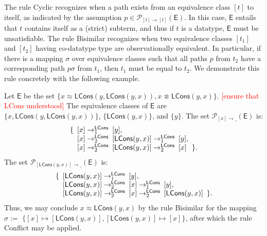 \documentclass[a4paper,oribibl,envcountsame,draft]{llncs}
\newcommand\const[1]{\textsf{#1}}
\newcommand{\Ec}{\mathsf{E}}
\newcommand{\rn}[1]{\textsf{\small #1}}
\newcommand{\teq}{\approx}
\newcommand{\tneq}{\not\teq}
\newcommand{\rem}[1]{\textcolor{red}{[#1]}}
\newcommand{\tpath}[2]{\mathcal{P}_{ #2 \rightarrow \_ }( #1 )}
\newcommand{\ttpath}[3]{\mathcal{P}_{ #2 \rightarrow #3 }( #1 )}
\newcommand{\ec}[1]{ [ #1 ] }
\begin{document}
The rule \rn{Cyclic} recognizes when a path exists from an equivalence class $\ec{t}$ to itself, as indicated
by the assumption $p \in \ttpath{\Ec}{\ec{t}}{\ec{t}}$.
In this case, $\Ec$ entails that $t$ contains itself as a (strict) subterm,
and thus if $t$ is a datatype, $\Ec$ must be unsatisfiable.
The rule \rn{Bisimilar} recognizes when two equivalence classes $\ec{t_1}$ and $\ec{t_2}$ having co-datatype type are observationally equivalent.
In particular, if there is a mapping $\sigma$ over equivalence classes such that all paths $p$ from $t_2$
have a corresponding path $p \sigma$ from $t_1$,
then $t_1$ must be equal to $t_2$.
We demonstrate this rule concretely with the following example.

\begin{example}
Let $\Ec$ be the set $\{ x \teq \const{LCons}(y,\const{LCons}(y,x)), x \tneq \const{LCons}(y,x) \}$.  \rem{ensure that \const{LCons} understood}
The equivalence classes of $\Ec$ are $\{ x, \const{LCons}(y,\const{LCons}(y,x)) \}$, $\{ \const{LCons}(y,x) \}$, and $\{ y \}$.
The set $\tpath{\Ec}{\ec{x}}$ is:
\[\begin{array}{l@{\hspace{.5em}}l@{\hspace{.5em}}l@{\hspace{.5em}}l@{\hspace{.5em}}l}
\{ & \ec{x} \rightarrow^{\const{LCons}}_1 & \ec{y}, & & \\ 
   & \ec{x} \rightarrow^{\const{LCons}}_2 & \ec{\const{LCons}(y,x)} \rightarrow^{\const{LCons}}_1 & \ec{y},& \\
   & \ec{x} \rightarrow^{\const{LCons}}_2 & \ec{\const{LCons}(y,x)} \rightarrow^{\const{LCons}}_2 & \ec{x} & \}.
\end{array}\]
The set $\tpath{\Ec}{\ec{\const{LCons}(y,x)}}$ is:
\[\begin{array}{l@{\hspace{.5em}}l@{\hspace{.5em}}l@{\hspace{.5em}}l@{\hspace{.5em}}l}
\{ & \ec{\const{LCons}(y,x)} \rightarrow^{\const{LCons}}_1 & \ec{y}, & & \\ 
   & \ec{\const{LCons}(y,x)} \rightarrow^{\const{LCons}}_2 & \ec{x} \rightarrow^{\const{LCons}}_1 & \ec{y},& \\
   & \ec{\const{LCons}(y,x)} \rightarrow^{\const{LCons}}_2 & \ec{x} \rightarrow^{\const{LCons}}_2 & \ec{\const{LCons}(y,x)} & \}.
\end{array}\]
Thus, we may conclude $x \teq \const{LCons}(y,x)$ by the rule \rn{Bisimilar}
for the mapping $\sigma :=$ $\{ \ec{x} \mapsto \ec{\const{LCons}(y,x)}, \ec{\const{LCons}(y,x)} \mapsto \ec{x} \}$,
after which the rule \rn{Conflict} may be applied.
\end{example}
\end{document}
